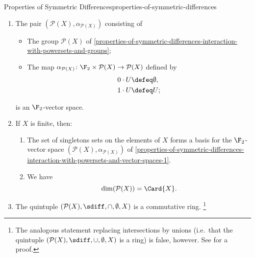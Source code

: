 \begin{proposition}{Properties of Symmetric Differences}{properties-of-symmetric-differences}
\begin{enumerate}
\begin{enumerate}
            \end{enumerate}
        \item\label{properties-of-symmetric-differences-interaction-with-powersets-and-vector-spaces-1}The pair $(\mathcal{P}(X),\alpha_{\mathcal{P}(X)})$ consisting of
            \begin{itemize}
                \item The group $\mathcal{P}(X)$ of \cref{properties-of-symmetric-differences-interaction-with-powersets-and-groups};
                \item The map $\alpha_{\mathcal{P}(X)}\colon\F_{2}\times\mathcal{P}(X)\to\mathcal{P}(X)$ defined by
                    \begin{align*}
                        0\cdot U &\defeq \emptyset,\\
                        1\cdot U &\defeq U;
                    \end{align*}
            \end{itemize}
            is an $\F_{2}$-vector space.
        \item\label{properties-of-symmetric-differences-interaction-with-powersets-and-vector-spaces-2}If $X$ is finite, then:
            \begin{enumerate}
                \item\label{properties-of-symmetric-differences-interaction-with-powersets-and-vector-spaces-2-a}The set of singletons sets on the elements of $X$ forms a basis for the $\F_{2}$-vector space $(\mathcal{P}(X),\alpha_{\mathcal{P}(X)})$ of \cref{properties-of-symmetric-differences-interaction-with-powersets-and-vector-spaces-1}.
                \item\label{properties-of-symmetric-differences-interaction-with-powersets-and-vector-spaces-2-b}We have
                    \[
                        \dim(\mathcal{P}(X))%
                        =%
                        \Card{X}.%
                    \]%
            \end{enumerate}
        \item\label{properties-of-symmetric-differences-interaction-with-powersets-and-rings}The quintuple $(\mathcal{P}(X),\sdiff,\cap,\emptyset,X)$ is a commutative ring.%
            \footnote{%
                \textdbend{}The analogous statement replacing intersections by unions (i.e.\ that the quintuple $(\mathcal{P}(X),\sdiff,\cup,\emptyset,X)$ is a ring) is false, however. See \cite{proof-wiki:symmetric-difference-with-union-does-not-form-ring} for a proof.
}
\end{enumerate}
\end{proposition}
